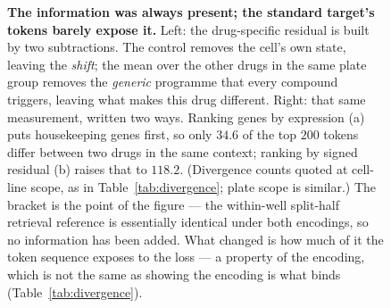 \begin{figure}[htbp]
\caption[The residual frame and the encoding fork]{\textbf{The information was always present; the
standard target's tokens barely expose it.} Left: the drug-specific residual is built by two
subtractions. The
control removes the cell's own state, leaving the \emph{shift}; the mean over the other drugs in the
same plate group removes the \emph{generic} programme that every compound triggers, leaving what
makes this drug different. Right: that same measurement, written two ways. Ranking genes by
expression (a) puts housekeeping genes first, so only $34.6$ of the top $200$ tokens differ between
two drugs in the same context; ranking by signed residual (b) raises that to $118.2$. (Divergence
counts quoted at cell-line scope, as in Table~\ref{tab:divergence}; plate scope is similar.) The
bracket is the point of the figure --- the within-well split-half retrieval reference is essentially
identical under both encodings, so no information has been added. What changed is how much of it the
token sequence exposes to the loss --- a property of the encoding, which is not the same as showing
the encoding is what binds (Table~\ref{tab:divergence}).}
\label{fig:frame}
\end{figure}
